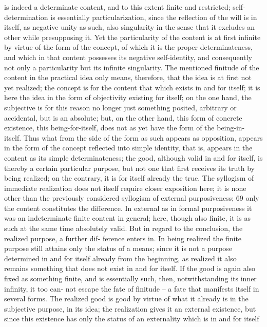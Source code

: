 is indeed a determinate content, and to this extent finite and restricted;
self-determination is essentially particularization, since the reflection of
the will is in itself, as negative unity as such, also singularity in the sense
that it excludes an other while presupposing it. Yet the particularity of the
content is at first infinite by virtue of the form of the concept, of which
it is the proper determinateness, and which in that content possesses its
negative self-identity, and consequently not only a particularity but its
infinite singularity. The mentioned finitude of the content in the practical
idea only means, therefore, that the idea is at first not yet realized; the
concept is for the content that which exists in and for itself; it is here the
idea in the form of objectivity existing for itself; on the one hand, the
subjective is for this reason no longer just something posited, arbitrary or
accidental, but is an absolute; but, on the other hand, this form of concrete
existence, this being-for-itself, does not as yet have the form of the being-in-
itself. Thus what from the side of the form as such appears as opposition,
appears in the form of the concept reflected into simple identity, that is,
appears in the content as its simple determinateness; the good, although
valid in and for itself, is thereby a certain particular purpose, but not one
that first receives its truth by being realized; on the contrary, it is for itself
already the true.
The syllogism of immediate realization does not itself require closer
exposition here; it is none other than the previously considered syllogism
of external purposiveness; 69 only the content constitutes the difference. In
external as in formal purposiveness it was an indeterminate finite content
in general; here, though also finite, it is as such at the same time absolutely
valid. But in regard to the conclusion, the realized purpose, a further dif-
ference enters in. In being realized the finite purpose still attains only the
status of a means; since it is not a purpose determined in and for itself
already from the beginning, as realized it also remains something that does
not exist in and for itself. If the good is again also fixed as something finite,
and is essentially such, then, notwithstanding its inner infinity, it too can-
not escape the fate of finitude – a fate that manifests itself in several forms.
The realized good is good by virtue of what it already is in the subjective
purpose, in its idea; the realization gives it an external existence, but since
this existence has only the status of an externality which is in and for itself
